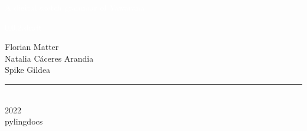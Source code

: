 \begin{titlingpage}
\BgThispage
{}
\vspace*{2cm}
\centering
\textcolor{white}{ \hugefont A digital sketch grammar of Yawarana }
\raggedleft
\vspace*{1cm}\par

\textcolor{white}{ \large 0.0.2.draft }

\vspace*{2cm}\par
\noindent
{
\begin{minipage}{0.90\linewidth}
    \begin{flushright}
        
{\Huge Florian Matter }\\[\baselineskip]

{\Huge Natalia Cáceres Arandia }\\[\baselineskip]

{\Huge Spike Gildea }\\[\baselineskip]

    \end{flushright}
\end{minipage} \hspace{15pt}
}
\centering
\vfill
\rule{0.4\textwidth}{0.4pt}\\
{\Huge 2022 \\ \large pylingdocs }
\end{titlingpage}
